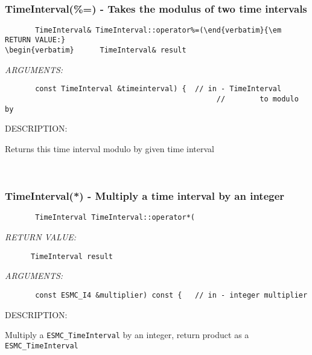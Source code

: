\mbox{}\hrulefill\ 
 
\subsubsection [TimeInterval(\%=)] {TimeInterval(\%=) - Takes the modulus of two time intervals}


  
\begin{verbatim}       TimeInterval& TimeInterval::operator%=(\end{verbatim}{\em RETURN VALUE:}
\begin{verbatim}      TimeInterval& result\end{verbatim}{\em ARGUMENTS:}
\begin{verbatim}       const TimeInterval &timeinterval) {  // in - TimeInterval
                                                 //        to modulo by\end{verbatim}
{\sf DESCRIPTION:\\ }


      Returns this time interval modulo by given time interval
   
 
\mbox{}\hrulefill\ 
 
\subsubsection [TimeInterval(*)] {TimeInterval(*) - Multiply a time interval by an integer}


  
\begin{verbatim}       TimeInterval TimeInterval::operator*(\end{verbatim}{\em RETURN VALUE:}
\begin{verbatim}      TimeInterval result\end{verbatim}{\em ARGUMENTS:}
\begin{verbatim}       const ESMC_I4 &multiplier) const {   // in - integer multiplier\end{verbatim}
{\sf DESCRIPTION:\\ }


       Multiply a {\tt ESMC\_TimeInterval} by an integer, return product as a
      {\tt ESMC\_TimeInterval}
   
 
